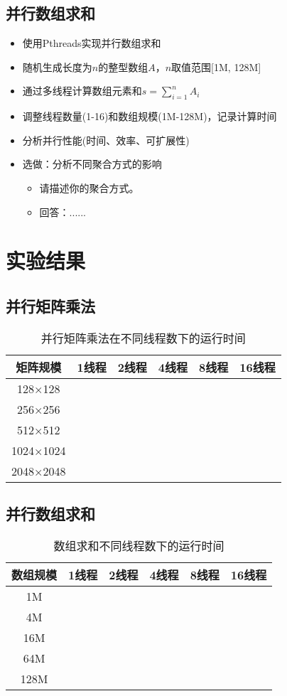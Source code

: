 \documentclass{SYSUReport}
\begin{document}
\subsection{并行数组求和}
\begin{itemize}
    \item 使用Pthreads实现并行数组求和
    \item 随机生成长度为$n$的整型数组$A$，$n$取值范围[1M, 128M]
    \item 通过多线程计算数组元素和$s = \sum_{i=1}^{n}A_i$
    \item 调整线程数量(1-16)和数组规模(1M-128M)，记录计算时间
    \item 分析并行性能(时间、效率、可扩展性)
    \item 选做：分析不同聚合方式的影响
     \begin{itemize}
        \item 请描述你的聚合方式。
        \item 回答：......
    \end{itemize}
\end{itemize}
\section{实验结果}
\subsection{并行矩阵乘法}

    \begin{table}[H]
\centering
\caption{并行矩阵乘法在不同线程数下的运行时间}
\begin{tabular}{cccccc}
\toprule
矩阵规模 & 1线程 & 2线程 & 4线程 & 8线程 & 16线程 \\
\midrule
128×128 & & & & & \\
256×256 & & & & & \\
512×512 & & & & & \\
1024×1024 & & & & & \\
2048×2048 & & & & & \\
\bottomrule
\end{tabular}
\end{table}
\subsection{并行数组求和}
\begin{table}[h]
\centering
\caption{数组求和不同线程数下的运行时间}
\begin{tabular}{cccccc}
\toprule
数组规模 & 1线程 & 2线程 & 4线程 & 8线程 & 16线程 \\
\midrule
1M & & & & & \\
4M & & & & & \\
16M & & & & & \\
64M & & & & & \\
128M & & & & & \\
\bottomrule
\end{tabular}
\end{table}
\end{document}
